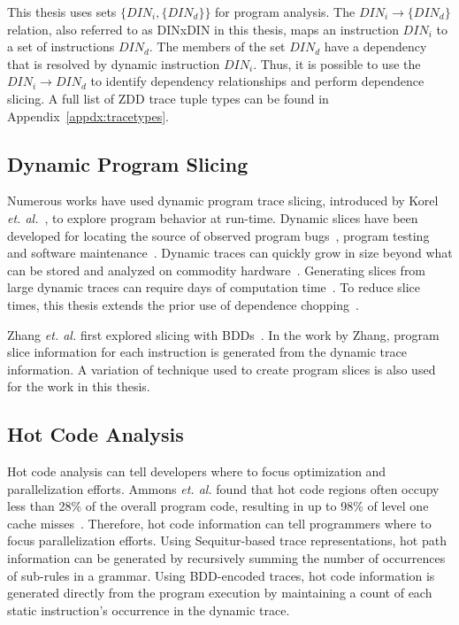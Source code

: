 {This thesis uses sets $\{DIN_{i}, \{DIN_{d}\}\}$ for program analysis. The $DIN_{i} \rightarrow \{DIN_{d}\}$ relation, also referred to as {DINxDIN} in this thesis, maps an instruction $DIN_i$ to a set of instructions $DIN_{d}$.  The members of the set $DIN_{d}$ have a dependency that is resolved by dynamic instruction $DIN_i$.  Thus, it is possible to use the $DIN_{i} \rightarrow DIN_{d}$ to identify dependency relationships and perform dependence slicing. A full list of ZDD trace tuple types can be found in Appendix~\ref{appdx:tracetypes}.

\subsection{Dynamic Program Slicing}

Numerous works have used dynamic program trace slicing, introduced by Korel \textit{et. al.}~\cite{korel:88:ipl}, to explore program behavior at run-time.  Dynamic slices have been developed for locating the source of observed program bugs~\cite{tip:94:cwi,agrawal:90:pldi}, program testing~\cite{gallager:91:se} and software maintenance~\cite{kamkar:93:sm}. Dynamic traces can quickly grow in size beyond what can be stored and analyzed on commodity hardware~\cite{agrawal:90:pldi, zhang:04:micro, price:06:cal}. Generating slices from large dynamic traces can require days of computation time~\cite{agrawal:90:pldi}.  To reduce slice times, this thesis extends the prior use of dependence chopping~\cite{gupta:2005:ase,krinke:2004:sqc}.

Zhang \textit{et. al.} first explored slicing with BDDs~\cite{zhang:04:icse}. In the work by Zhang, program slice information for each instruction is generated from the dynamic trace information. A variation of technique used to create program slices is also used for the work in this thesis.

\subsection{Hot Code Analysis}

Hot code analysis can tell developers where to focus optimization and parallelization efforts.  Ammons \textit{et. al.} found that hot code regions often occupy less than 28\% of the overall program code, resulting in up to 98\% of level one cache misses~\cite{ammons:97:sigplan}.  Therefore, hot code information can tell programmers where to focus parallelization efforts.  Using Sequitur-based trace representations, hot path information can be generated by recursively summing the number of occurrences of sub-rules in a grammar. Using BDD-encoded traces, hot code information is generated directly from the program execution by maintaining a count of each static instruction's occurrence in the dynamic trace.

}
